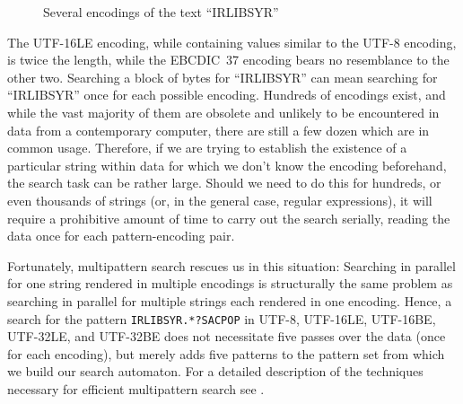 \documentclass[5p,final,number,sort&compress]{elsarticle}
\begin{document}
\begin{figure}[th]
\caption{Several encodings of the text ``IRLIBSYR''\label{fig:enc}}
\end{figure}

The UTF-16LE encoding, while containing values similar to the UTF-8 encoding, is twice the length, while the EBCDIC~37 encoding bears no resemblance to the other two. Searching a block of bytes for ``IRLIBSYR'' can mean searching for ``IRLIBSYR'' once for each possible encoding. Hundreds of encodings exist, and while the vast majority of them are obsolete and unlikely to be encountered in data from a contemporary computer, there are still a few dozen which are in common usage. Therefore, if we are trying to establish the existence of a particular string within data for which we don't know the encoding beforehand, the search task can be rather large. Should we need to do this for hundreds, or even thousands of strings (or, in the general case, regular expressions), it will require a prohibitive amount of time to carry out the search serially, reading the data once for each pattern-encoding pair.

Fortunately, multipattern search rescues us in this situation: Searching in parallel for one string rendered in multiple encodings is structurally the same problem as searching in parallel for multiple strings each rendered in one encoding. Hence, a search for the pattern \texttt{IRLIBSYR.*?SACPOP} in UTF-8, UTF-16LE, UTF-16BE, UTF-32LE, and UTF-32BE does not necessitate five passes over the data (once for each encoding), but merely adds five patterns to the pattern set from which we build our search automaton. For a detailed description of the techniques necessary for efficient multipattern search see \citep{StewartUckelmanIFIP2011}.
\end{document}
